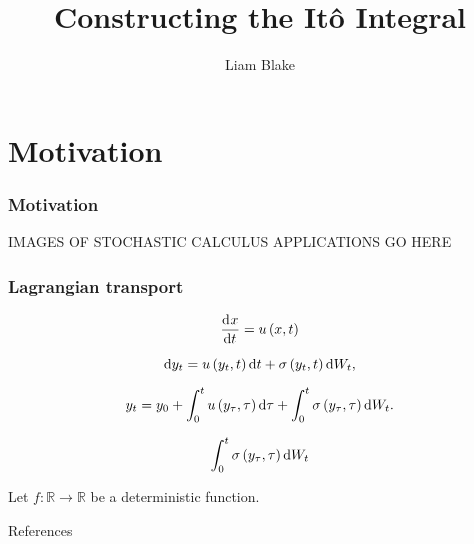 \documentclass{beamer}
\title{Constructing the It\^o Integral}
\author{Liam Blake}
\institute{The University of Adelaide}
\newcommand{\R}{\mathbb{R}}
\begin{document}
\frame{\titlepage}


\begin{frame}
\end{frame}

\section{Motivation}
\begin{frame}
	\frametitle{Motivation}
	IMAGES OF STOCHASTIC CALCULUS APPLICATIONS GO HERE
\end{frame}

\begin{frame}
	\frametitle{Lagrangian transport}
	
\end{frame}


\begin{frame}
	\[
		\dod{x}{t} = u\left(x, t\right)
	\]
\end{frame}

\begin{frame}

\end{frame}

\begin{frame}
	\[
		\dif y_t = u\left(y_t, t\right)\dif t + \sigma\left(y_t, t\right)\dif W_t,
	\]
\end{frame}

\begin{frame}
	\[
		y_t = y_0 + \int_0^t{u\left(y_\tau, \tau\right)\dif\tau} + \int_0^t{\sigma\left(y_\tau, \tau\right)\dif W_t}.
	\]
	
	
\end{frame}



\begin{frame}
	\[
		\int_0^t{\sigma\left(y_\tau, \tau\right)\dif W_t}
	\]
	
\end{frame}



\begin{frame}
	Let \(f: \R \to \R\) be a deterministic function.
\end{frame}




\begin{frame}{References}
	\nocite{*}
	
	
\end{frame}
\end{document}
